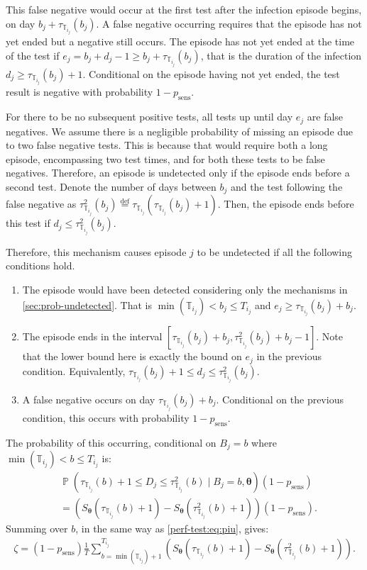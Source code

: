 \documentclass[12pt]{article}
\DeclareMathOperator{\prob}{\mathbb{P}}
\renewcommand{\vec}[1]{\bm{#1}}
\newcommand{\psens}{p_\text{sens}}
\newcommand{\sched}{\mathbb{T}}
\begin{document}
This false negative would occur at the first test after the infection episode begins, on day $b_j + \tau_{\sched_{i_j}}(b_j)$.
A false negative occurring requires that the episode has not yet ended but a negative still occurs.
The episode has not yet ended at the time of the test if $e_j = b_j + d_j - 1 \geq b_j + \tau_{\sched_{i_j}}(b_j)$, that is the duration of the infection $d_j \geq \tau_{\sched_{i_j}}(b_j) + 1$.
Conditional on the episode having not yet ended, the test result is negative with probability $1 - \psens$.

For there to be no subsequent positive tests, all tests up until day $e_j$ are false negatives.
We assume there is a negligible probability of missing an episode due to two false negative tests.
This is because that would require both a long episode, encompassing two test times, and for both these tests to be false negatives.
Therefore, an episode is undetected only if the episode ends before a second test.
Denote the number of days between $b_j$ and the test following the false negative as $\tau^2_{\sched_{i_j}}(b_j) \stackrel{\text{def}}{=} \tau_{\sched_{i_j}}(\tau_{\sched_{i_j}}(b_j) + 1)$.
Then, the episode ends before this test if $d_j \leq \tau^2_{\sched_{i_j}}(b_j)$.

Therefore, this mechanism causes episode $j$ to be undetected if all the following conditions hold.
\begin{enumerate}
    \item The episode would have been detected considering only the mechanisms in \cref{sec:prob-undetected}. That is $\min(\sched_{i_j}) < b_j \leq T_{i_j}$ and $e_j \geq \tau_{\sched_{i_j}}(b_j) + b_j$.
    \item The episode ends in the interval $[\tau_{\sched_{i_j}}(b_j) + b_j, \tau^2_{\sched_{i_j}}(b_j) + b_j - 1]$.
      Note that the lower bound here is exactly the bound on $e_j$ in the previous condition.
      Equivalently, $\tau_{\sched_{i_j}}(b_j) + 1 \leq d_j \leq \tau^2_{\sched_{i_j}}(b_j)$.
    \item A false negative occurs on day $\tau_{\sched_{i_j}}(b_j) + b_j$. Conditional on the previous condition, this occurs with probability $1 - \psens$.
\end{enumerate}

The probability of this occurring, conditional on $B_j = b$ where $\min(\sched_{i_j}) < b \leq T_{i_j}$ is:
\begin{align}
&\prob \left(
    \tau_{\sched_{i_j}}(b) + 1 \leq D_j \leq \tau^2_{\sched_{i_j}}(b)
    \mid B_j = b, \vec{\theta} \right) (1 - \psens) \\
&= \left( S_{\vec{\theta}}(\tau_{\sched_{i_j}}(b) + 1) - S_{\vec{\theta}}(\tau^2_{\sched_{i_j}}(b) + 1) \right) (1 - \psens).
\end{align}
Summing over $b$, in the same way as \cref{perf-test:eq:piu}, gives:
\begin{align}
\zeta = (1 - p_\text{sens})\frac{1}{T} \sum_{b=\min(\sched_{i_j}) + 1}^{T_{i_j}} \left( S_{\vec{\theta}}(\tau_{\sched_{i_j}}(b) + 1) - S_{\vec{\theta}}(\tau^2_{\sched_{i_j}}(b) + 1) \right).
\label{imperf-test:eq:zeta}
\end{align}
\end{document}
